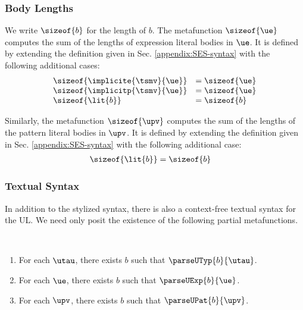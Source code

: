 \subsubsection{Body Lengths}
We write $\sizeof{b}$ for the length of $b$. The metafunction $\sizeof{\ue}$ computes the sum of the lengths of expression literal bodies in $\ue$. It is defined by extending the definition given in Sec. \ref{appendix:SES-syntax} with the following additional cases:
\[
\begin{array}{ll}
\sizeof{\implicite{\tsmv}{\ue}} & = \sizeof{\ue}\\
\sizeof{\implicitp{\tsmv}{\ue}} & = \sizeof{\ue}\\
\sizeof{\lit{b}} & = \sizeof{b}
\end{array}
\]

Similarly, the metafunction $\sizeof{\upv}$ computes the sum of the lengths of the pattern literal bodies in $\upv$. It is defined by extending the definition given in Sec. \ref{appendix:SES-syntax} with the following additional case:
\begin{align*}
\sizeof{\lit{b}} & = \sizeof{b}
\end{align*}

\subsubsection{Textual Syntax}
In addition to the stylized syntax, there is also a context-free textual syntax for the UL. We need only posit the existence of the following partial metafunctions.

\begin{condition}\label{condition:textual-representability-BS} ~
\begin{enumerate}
\item For each $\utau$, there exists $b$ such that $\parseUTyp{b}{\utau}$. 
\item For each $\ue$, there exists $b$ such that $\parseUExp{b}{\ue}$.
\item {For each $\upv$, there exists $b$ such that $\parseUPat{b}{\upv}$.}
\end{enumerate}
\end{condition}

